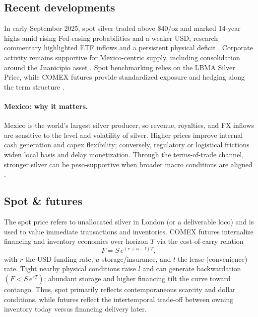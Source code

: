 \documentclass[11pt,a4paper]{article} %
\begin{document}
\subsection{Recent developments}
In early September 2025, spot silver traded above \$40/oz and marked 14-year highs amid rising Fed-easing probabilities and a weaker USD; research commentary highlighted ETF inflows and a persistent physical deficit \citep{reuters_silver_14y_sep1,reuters_tradingday_sep11,reuters_anz_raises_silver,lbma_q2_2025}. Corporate activity remains supportive for Mexico-centric supply, including consolidation around the Juanicipio asset \citep{reuters_paasmag}. Spot benchmarking relies on the LBMA Silver Price, while COMEX futures provide standardized exposure and hedging along the term structure \citep{lbma_prices,cme_silver_overview}.

\paragraph{Mexico: why it matters.}
Mexico is the world's largest silver producer, so revenue, royalties, and FX inflows are sensitive to the level and volatility of silver. Higher prices improve internal cash generation and capex flexibility; conversely, regulatory or logistical frictions widen local basis and delay monetization. Through the terms-of-trade channel, stronger silver can be peso-supportive when broader macro conditions are aligned \citep{reuters_mx_top_silver}.

\subsection{Spot \& futures}
The spot price refers to unallocated silver in London (or a deliverable loco) and is used to value immediate transactions and inventories. COMEX futures internalize financing and inventory economics over horizon \(T\) via the cost-of-carry relation
\[
F=S\,e^{(r+u-l)T},
\]
with \(r\) the USD funding rate, \(u\) storage/insurance, and \(l\) the lease (convenience) rate. Tight nearby physical conditions raise \(l\) and can generate backwardation \((F<S\,e^{rT})\); abundant storage and higher financing tilt the curve toward contango. Thus, spot primarily reflects contemporaneous scarcity and dollar conditions, while futures reflect the intertemporal trade-off between owning inventory today versus financing delivery later.
\end{document}
